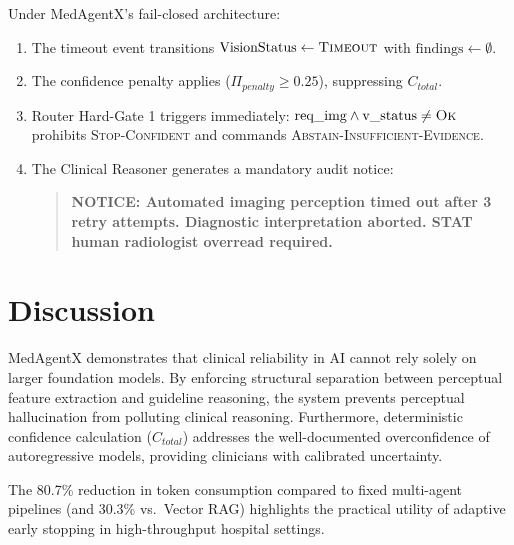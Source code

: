 \documentclass[journal,10pt,twocolumn]{IEEEtran}
\begin{document}
Under MedAgentX's fail-closed architecture:
\begin{enumerate}
    \item The timeout event transitions $\text{VisionStatus} \leftarrow \textsc{Timeout}$ with $\text{findings} \leftarrow \emptyset$.
    \item The confidence penalty applies ($\Pi_{penalty} \ge 0.25$), suppressing $C_{total}$.
    \item Router Hard-Gate 1 triggers immediately: $\text{req\_img} \land \text{v\_status} \neq \textsc{Ok}$ prohibits \textsc{Stop-Confident} and commands \textsc{Abstain-Insufficient-Evidence}.
    \item The Clinical Reasoner generates a mandatory audit notice:
    \begin{quote}
    \textbf{NOTICE: Automated imaging perception timed out after 3 retry attempts. Diagnostic interpretation aborted. STAT human radiologist overread required.}
    \end{quote}
\end{enumerate}

\section{Discussion}
MedAgentX demonstrates that clinical reliability in AI cannot rely solely on larger foundation models. By enforcing structural separation between perceptual feature extraction and guideline reasoning, the system prevents perceptual hallucination from polluting clinical reasoning. Furthermore, deterministic confidence calculation ($C_{total}$) addresses the well-documented overconfidence of autoregressive models, providing clinicians with calibrated uncertainty.

The 80.7\% reduction in token consumption compared to fixed multi-agent pipelines (and 30.3\% vs.\ Vector RAG) highlights the practical utility of adaptive early stopping in high-throughput hospital settings.
\end{document}
